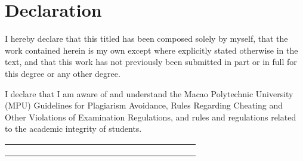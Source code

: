 \chapter{Declaration}

I hereby declare that this {\InsertThesisType} titled {\bf\InsertTitle} has been composed solely by myself, that the work contained herein is my own except where explicitly stated otherwise in the text, and that this work has not previously been submitted in part or in full for this degree or any other degree.

I declare that I am aware of and understand the Macao Polytechnic University (MPU) Guidelines for Plagiarism Avoidance, Rules Regarding Cheating and Other Violations of Examination Regulations, and rules and regulations related to the academic integrity of students.

\vspace*{0.75in}

\begin{center}
	\onehalfspacing
	\begin{tabular}{
			>{\raggedleft\arraybackslash}p{0.15\linewidth}
			>{\raggedright\arraybackslash}p{0.4\linewidth}
			>{\raggedleft\arraybackslash}p{0.05\linewidth}
			>{}p{0.25\linewidth}
		}
        & \multicolumn{3}{l}{\InsertStudentName}\\
		& \multicolumn{3}{l}{\InsertProgramme}\\
		& \multicolumn{3}{l}{\InsertAcademicUnit}\\
	\end{tabular}
\end{center}

\endinput